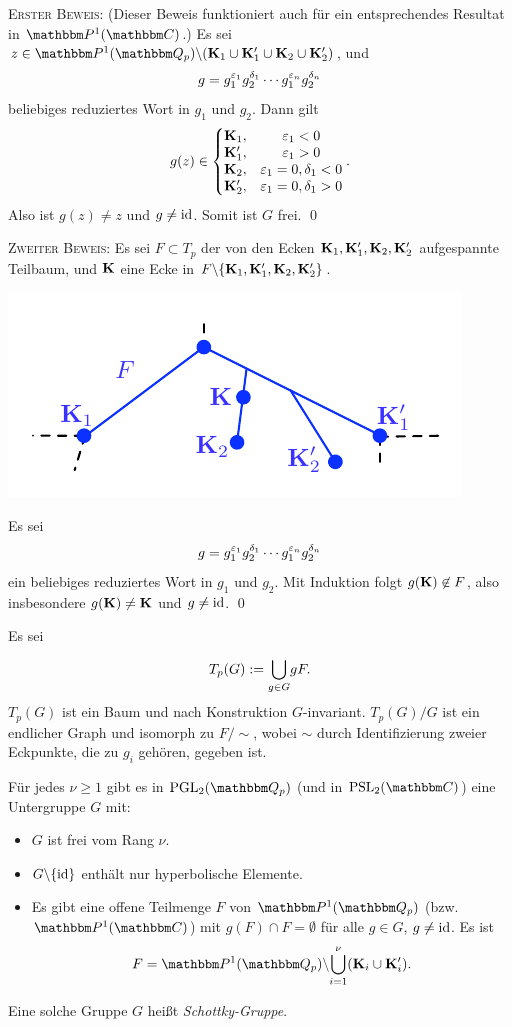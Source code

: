 \documentclass[a4paper, 12pt, twoside]{article}
\begin{document}
\textsc{Erster Beweis:}
(Dieser Beweis funktioniert auch für ein entsprechendes
Resultat in $\PP^1(\CC)$.)
Es sei
$z\in\PP^1(\QQ_p)\backslash(\KU_1\cup\KU_1'\cup\KU_2\cup\KU_2')$,
und
\[
g = g_1^{\varepsilon_1} g_2^{\delta_1} \cdots g_1^{\varepsilon_n} g_2^{\delta_n}
\]
beliebiges reduziertes Wort in $g_1$ und $g_2$.
Dann gilt
\[
g(z) \in
\left\{
\begin{matrix}
\mathbf{K}_1, & \varepsilon_1<0 \\
\mathbf{K}_1', &\varepsilon_1>0 \\
\mathbf{K}_2, &\varepsilon_1=0,\delta_1<0\\
\mathbf{K}_2', &\varepsilon_1=0,\delta_1>0
\end{matrix}
\right..
\]
Also ist $g(z)\neq z$ und $g\neq\mathrm{id}$. Somit ist $G$ frei.
\qed

\textsc{Zweiter Beweis:} Es sei $F\subset T_p$ der von den Ecken
$\mathbf{K}_1,\mathbf{K}_1',\mathbf{K}_2,\mathbf{K}_2'$ aufgespannte Teilbaum, und
$\mathbf{K}$ eine Ecke in $F\backslash\{\mathbf{K}_1,\mathbf{K}_1',\mathbf{K}_2,\mathbf{K}_2'\}$.
\begin{center}
	\includegraphics{grugraImages/ihara2}
\end{center}
Es sei
\[
g = g_1^{\varepsilon_1} g_2^{\delta_1} \cdots g_1^{\varepsilon_n} g_2^{\delta_n}
\]
ein beliebiges reduziertes Wort in $g_1$ und $g_2$.
Mit Induktion folgt $g(\mathbf{K})\not\in F$, also insbesondere
$g(\mathbf{K})\neq\mathbf{K}$ und $g\neq \mathrm{id}$.
\qed

\BEM Es sei
\[
T_p(G):=\overset{}{\underset{g\in G}{\mathop{\bigcup}}} g F.
\]
$T_p(G)$ ist ein Baum und nach Konstruktion $G$-invariant.
$T_p(G)/G$ ist ein endlicher Graph und isomorph zu $F/\sim$, wobei
$\sim$ durch Identifizierung zweier Eckpunkte, die zu $g_i$ gehören,
gegeben ist.

\BEM Für jedes $\nu\geq 1$ gibt es in $\PGL_2(\QQ_p)$ (und in
$\PSL_2(\CC)$) eine Untergruppe $G$ mit:
\begin{itemize}
\item $G$ ist frei vom Rang $\nu$.
\item $G\backslash\{\mathrm{id}\}$ enthält nur hyperbolische Elemente.
\item Es gibt eine offene Teilmenge $F$ von $\PP^1(\QQ_p)$ (bzw.
$\PP^1(\CC)$) mit $g(F)\cap F=\emptyset$ für alle $g\in G$,
$g\neq\mathrm{id}$. Es ist
\[
F=\PP^1(\QQ_p)\backslash\BCUP{\nu}{i=1}(\KU_i\cup\KU_i').
\]
\end{itemize}
Eine solche Gruppe $G$ heißt \emph{Schottky-Gruppe}.
\end{document}
